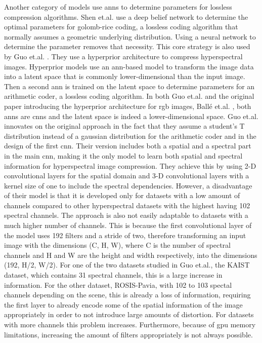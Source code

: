 Another category of models use \acp{ann} to determine parameters for lossless compression algorithms. Shen et.al. \citep{shen_golomb-rice_2017} use a deep belief network to determine the optimal parameters for golomb-rice coding, a lossless coding algorithm that normally assumes a geometric underlying distribution. Using a neural network to determine the parameter removes that necessity.
This core strategy is also used by Guo et.al. \citep{guo_learned_2021}. They use a hyperprior architecture to compress hyperspectral images. Hyperprior models use an \ac{ann}-based model to transform the image data into a latent space that is commonly lower-dimensional than the input image. Then a second \ac{ann} is trained on the latent space to determine parameters for an arithmetic coder, a lossless coding algorithm. In both Guo et.al. and the original paper introducing the hyperprior architecture for \ac{rgb} images, Ballé et.al. \citep{balle_end--end_2017}, both \acp{ann} are \acp{cnn} and the latent space is indeed a lower-dimensional space.
Guo et.al. innovates on the original approach in the fact that they assume a student's T distribution instead of a gaussian distribution for the arithmetic coder and in the design of the first \ac{cnn}. Their version includes both a spatial and a spectral part in the main \ac{cnn}, making it the only model to learn both spatial and spectral information for hyperspectral image compression. They achieve this by using 2-D convolutional layers for the spatial domain and 3-D convolutional layers with a kernel size of one to include the spectral dependencies. However, a disadvantage of their model is that it is developed only for datasets with a low amount of channels compared to other hyperspectral datasets with the highest having 102 spectral channels. The approach is also not easily adaptable to datasets with a much higher number of channels. This is because the first convolutional layer of the model uses 192 filters and a stride of two, therefore transforming an input image with the dimensions (C, H, W), where C is the number of spectral channels and H and W are the height and width respectively, into the dimensions (192, H/2, W/2). For one of the two datasets studied in Guo et.al., the KAIST dataset, which contains 31 spectral channels, this is a large increase in information. For the other dataset, ROSIS-Pavia, with 102 to 103 spectal channels depending on the scene, this is already a loss of information, requiring the first layer to already encode some of the spatial information of the image appropriately in order to not introduce large amounts of distortion. For datasets with more channels this problem increases. Furthermore, because of \ac{gpu} memory limitations, increasing the amount of filters appropriately is not always possible.

